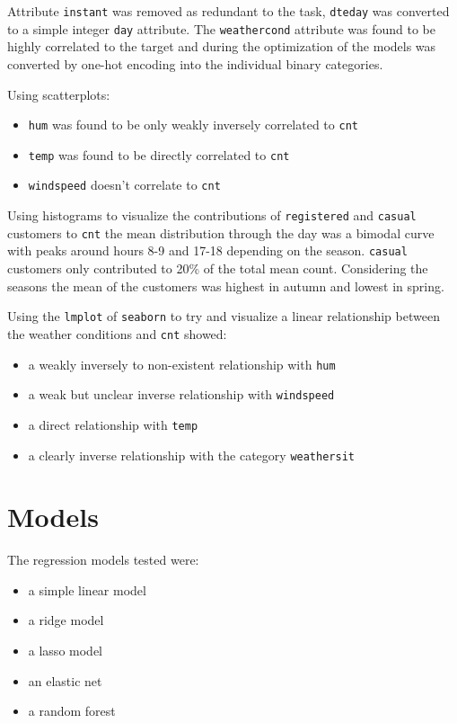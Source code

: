 \documentclass[11pt]{article}
\begin{document}
Attribute \texttt{instant} was removed as redundant to the task, \texttt{dteday} was converted to a simple integer \texttt{day} attribute.
The \texttt{weathercond} attribute was found to be highly correlated to the target and during the optimization of the models was converted by one-hot encoding into the individual binary categories.

Using scatterplots:
\begin{itemize}
\item \texttt{hum} was found to be only weakly inversely correlated to \texttt{cnt}
\item \texttt{temp} was found to be directly correlated to \texttt{cnt}
\item \texttt{windspeed} doesn't correlate to \texttt{cnt}
\end{itemize}

Using histograms to visualize the contributions of \texttt{registered} and \texttt{casual} customers to \texttt{cnt} the mean distribution through the day was a bimodal curve with peaks around hours 8-9 and 17-18 depending on the season.
\texttt{casual} customers only contributed to 20\% of the total mean count.
Considering the seasons the mean of the customers was highest in autumn and lowest in spring.

Using the \texttt{lmplot} of \texttt{seaborn} to try and visualize a linear relationship between the weather conditions and \texttt{cnt} showed:
\begin{itemize}
\item a weakly inversely to non-existent relationship with \texttt{hum}
\item a weak but unclear inverse relationship with \texttt{windspeed}
\item a direct relationship with \texttt{temp}
\item a clearly inverse relationship with the category \texttt{weathersit}
\end{itemize}


\section{Models}
\label{sec:org3cd9679}
The regression models tested were:
\begin{itemize}
\item a simple linear model
\item a ridge model
\item a lasso model
\item an elastic net
\item a random forest
\end{itemize}
\end{document}
